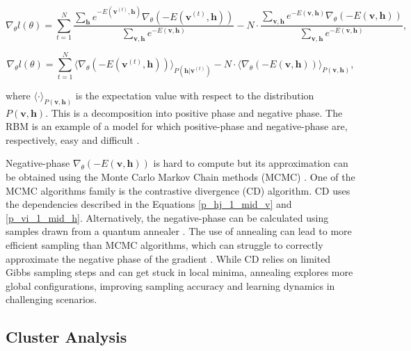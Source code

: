 \documentclass[a4paper,12pt]{article}
\begin{document}
\begin{equation}
    \nabla_{\theta} l(\theta) = \sum_{t=1}^N \frac{\sum_\mathbf{h} e^{-E(\mathbf{v}^{(t)}, \mathbf{h})} \nabla_{\theta} \left(-E(\mathbf{v}^{(t)}, \mathbf{h})\right)}{\sum_{\mathbf{v}, \mathbf{h}} e^{-E(\mathbf{v}, \mathbf{h})}} - N \cdot \frac{\sum_{\mathbf{v}, \mathbf{h}} e^{-E(\mathbf{v}, \mathbf{h})} \nabla_{\theta} \left(-E(\mathbf{v}, \mathbf{h})\right)}{\sum_{\mathbf{v}, \mathbf{h}} e^{-E(\mathbf{v}, \mathbf{h})}},
\end{equation}

\begin{equation}
    \nabla_{\theta} l(\theta) = \sum_{t=1}^N \langle \nabla_{\theta} \left(-E(\mathbf{v}^{(t)}, \mathbf{h})\right) \rangle_{P(\mathbf{h} | \mathbf{v}^{(t)})} - N \cdot \langle \nabla_{\theta} \left(-E(\mathbf{v}, \mathbf{h})\right) \rangle_{P(\mathbf{v}, \mathbf{h})},
\end{equation}

\noindent  where $\langle \cdot \rangle_{P(\mathbf{v},\mathbf{h})}$ is the expectation value with respect to the distribution $P(\mathbf{v}, \mathbf{h})$. This is a decomposition into positive phase and negative phase. The RBM is an example of a model for which positive-phase and negative-phase are, respectively, easy and difficult \cite{Dixit2021RBM_DWave, Goodfellow2016}.

Negative-phase $\nabla_{\theta} (-E(\mathbf{v}, \mathbf{h}))$ is hard to compute but its approximation can be obtained using the Monte Carlo Markov Chain methods (MCMC) \cite{Goodfellow2016}. One of the MCMC algorithms family is the contrastive divergence (CD) algorithm. CD uses the dependencies described in the Equations \eqref{p_hj_1_mid_v} and \eqref{p_vi_1_mid_h}. Alternatively, the negative-phase can be calculated using samples drawn from a quantum annealer \cite{Dixit2021RBM_DWave}. The use of annealing can lead to more efficient sampling than MCMC algorithms, which can struggle to correctly approximate the negative phase of the gradient \cite{Goodfellow2016}. While CD relies on limited Gibbs sampling steps and can get stuck in local minima, annealing explores more global configurations, improving sampling accuracy and learning dynamics in challenging scenarios.

\subsection{Cluster Analysis}\label{cluster_analysis_section}
\end{document}
